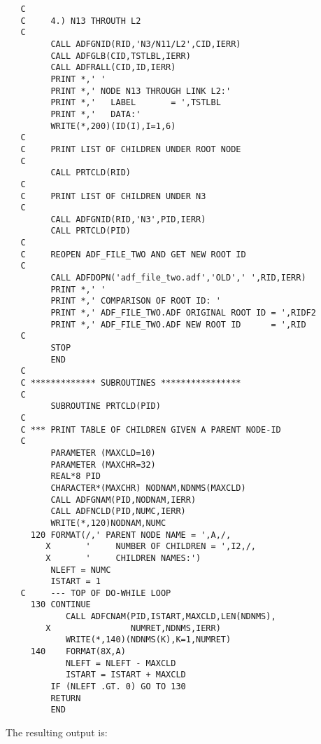 \begin{verbatim}
   C
   C     4.) N13 THROUTH L2
   C
         CALL ADFGNID(RID,'N3/N11/L2',CID,IERR)
         CALL ADFGLB(CID,TSTLBL,IERR)
         CALL ADFRALL(CID,ID,IERR)
         PRINT *,' '
         PRINT *,' NODE N13 THROUGH LINK L2:'
         PRINT *,'   LABEL       = ',TSTLBL
         PRINT *,'   DATA:'
         WRITE(*,200)(ID(I),I=1,6)
   C
   C     PRINT LIST OF CHILDREN UNDER ROOT NODE
   C
         CALL PRTCLD(RID)
   C
   C     PRINT LIST OF CHILDREN UNDER N3
   C
         CALL ADFGNID(RID,'N3',PID,IERR)
         CALL PRTCLD(PID)
   C
   C     REOPEN ADF_FILE_TWO AND GET NEW ROOT ID
   C
         CALL ADFDOPN('adf_file_two.adf','OLD',' ',RID,IERR)
         PRINT *,' '
         PRINT *,' COMPARISON OF ROOT ID: '
         PRINT *,' ADF_FILE_TWO.ADF ORIGINAL ROOT ID = ',RIDF2
         PRINT *,' ADF_FILE_TWO.ADF NEW ROOT ID      = ',RID
   C
         STOP
         END
   C
   C ************* SUBROUTINES ****************
   C
         SUBROUTINE PRTCLD(PID)
   C
   C *** PRINT TABLE OF CHILDREN GIVEN A PARENT NODE-ID
   C
         PARAMETER (MAXCLD=10)
         PARAMETER (MAXCHR=32)
         REAL*8 PID
         CHARACTER*(MAXCHR) NODNAM,NDNMS(MAXCLD)
         CALL ADFGNAM(PID,NODNAM,IERR)
         CALL ADFNCLD(PID,NUMC,IERR)
         WRITE(*,120)NODNAM,NUMC
     120 FORMAT(/,' PARENT NODE NAME = ',A,/,
        X       '     NUMBER OF CHILDREN = ',I2,/,
        X       '     CHILDREN NAMES:')
         NLEFT = NUMC
         ISTART = 1
   C     --- TOP OF DO-WHILE LOOP
     130 CONTINUE
            CALL ADFCNAM(PID,ISTART,MAXCLD,LEN(NDNMS),
        X                NUMRET,NDNMS,IERR)
            WRITE(*,140)(NDNMS(K),K=1,NUMRET)
     140    FORMAT(8X,A)
            NLEFT = NLEFT - MAXCLD
            ISTART = ISTART + MAXCLD
         IF (NLEFT .GT. 0) GO TO 130
         RETURN
         END
\end{verbatim}

\noindent
The resulting output is:

